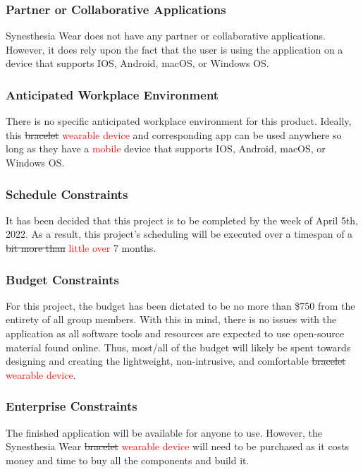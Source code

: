 \documentclass[12pt]{article}
\begin{document}
\subsubsection{Partner or Collaborative Applications}
Synesthesia Wear does not have any partner or collaborative applications. However, it 
does rely upon the fact that the user is using the application on a device that supports
IOS, Android, macOS, or Windows OS. 

\subsubsection{Anticipated Workplace Environment}
There is no specific anticipated workplace environment for this product. Ideally, this 
\sout{bracelet} \textcolor{red}{wearable device} and corresponding app can be used anywhere so long as they have a \textcolor{red}{mobile} device that 
supports IOS, Android, macOS, or Windows OS.

\subsubsection{Schedule Constraints}
It has been decided that this project is to be completed by the week of April 5th, 2022.
As a result, this project's scheduling will be executed over a timespan of a \sout{bit more 
than} \textcolor{red}{little over} 7 months.

\subsubsection{Budget Constraints}
For this project, the budget has been dictated to be no more than \$750 from the entirety 
of all group members. With this in mind, there is no issues with the application as all 
software tools and resources are expected to use open-source material found online. Thus, 
most/all of the budget will likely be spent towards designing and creating the lightweight, 
non-intrusive, and comfortable \sout{bracelet} \textcolor{red}{wearable device}.

\subsubsection{Enterprise Constraints}
The finished application will be available for anyone to use. However, the Synesthesia Wear 
\sout{bracelet} \textcolor{red}{wearable device} will need to be purchased as it costs money and time to buy all the components and 
build it. 
\end{document}

